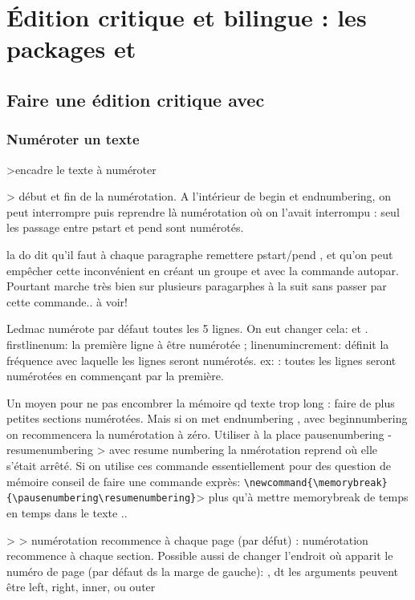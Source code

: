 \chapter{Édition critique et bilingue : les packages  et }

\section{Faire une édition critique avec }

\subsection{Numéroter un texte}

>encadre le texte à numéroter

> début et fin de la numérotation. A l'intérieur de begin et endnumbering,  on peut interrompre puis reprendre là numérotation où on l'avait interrompu : seul les passage entre pstart et pend sont numérotés.

la do dit qu'il faut à chaque paragraphe remettere pstart/pend , et qu'on peut empêcher cette inconvénient en créant un groupe et avec la commande autopar. Pourtant marche très bien sur plusieurs paragarphes à la suit sans passer par cette commande.. à voir!


Ledmac numérote par défaut toutes les 5 lignes. On eut changer cela:
 et .
firstlinenum: la première ligne à être numérotée ; linenumincrement: définit la fréquence avec laquelle les lignes seront numérotés. ex:   : toutes les lignes seront numérotées en commençant par la première. 

Un moyen pour ne pas encombrer la mémoire qd texte trop long : faire de plus petites sections numérotées. Mais si on met endnumbering ,  avec beginnumbering on recommencera la numérotation à zéro.  Utiliser à la place pausenumbering - resumenumbering > avec resume numbering la nmérotation reprend où elle s'était arrêté. Si on utilise ces commande essentiellement pour des question de mémoire conseil de faire une commande exprès: \verb|\newcommand{\memorybreak}{\pausenumbering\resumenumbering}|> plus qu'à mettre memorybreak de temps en temps dans le texte ..

 >  > numérotation recommence à chaque page  (par défut) : numérotation recommence à chaque section.
Possible aussi de changer l'endroit où apparit le numéro de page (par défaut ds la marge de gauche): , dt les arguments peuvent être left, right, inner, ou outer

